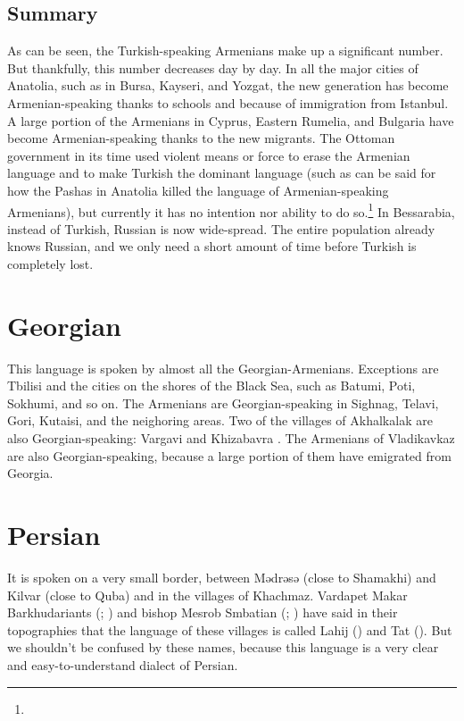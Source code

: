 \subsection{Summary}

As can be seen, the Turkish-speaking Armenians make up a significant number. But thankfully, this number decreases day by day. In all the major cities of Anatolia, such as in Bursa, Kayseri, and Yozgat, the new generation has become Armenian-speaking thanks to schools and because of immigration from Istanbul. A large portion of the Armenians in Cyprus, Eastern Rumelia, and Bulgaria have become Armenian-speaking thanks to the new migrants. The Ottoman government in its time used violent means or force to erase the Armenian language and to make Turkish   the dominant language (such as can be said for how the Pashas in Anatolia killed the language of Armenian-speaking Armenians), but currently it has no intention nor ability to do  so.\footnote{} In Bessarabia, instead of Turkish, Russian is now wide-spread. The entire population already knows Russian, and we only need a short amount of time before Turkish is completely lost. 

\section{Georgian}

This language is spoken by almost all the Georgian-Armenians. Exceptions are Tbilisi and the cities on the shores of the Black Sea, such as Batumi, Poti, Sokhumi, and so on. The Armenians are Georgian-speaking in Sighnag, Telavi, Gori, Kutaisi, and the neighoring areas. Two of the villages of Akhalkalak are also Georgian-speaking: Vargavi and Khizabavra . The Armenians of Vladikavkaz are also Georgian-speaking, because a large portion of them have emigrated from Georgia. 

\section{Persian}

It is spoken on a very small border, between Mədrəsə (close to Shamakhi) and Kilvar (close to Quba) and in the villages of Khachmaz. Vardapet Makar Barkhudariants (; ) and bishop Mesrob Smbatian (; ) have said in their topographies that the language of these villages is called Lahij () and Tat (). But we shouldn't be confused by these names, because this language is a very clear and easy-to-understand dialect of Persian.


